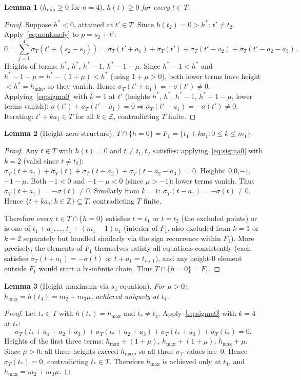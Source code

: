 \documentclass{article}
\newtheorem{lemma}{Lemma}
\begin{document}
\begin{lemma}[$h_{\min}\ge 0$ for $n=4$]\label{lem:betamin4}
$h(t)\ge 0$ for every $t\in T$.
\end{lemma}
\begin{proof}
Suppose $h^*<0$, attained at $t'\in T$.  Since $h(t_2)=0>h^*$: $t'\ne t_2$.
Apply~\eqref{eq:nonlonely} to $p=s_2+t'$:
\[
  0=\sum_{j=1}^4\sigma_T(t'+(s_2-s_j))
  =\sigma_T(t'+a_1)+\sigma_T(t')+\sigma_T(t'-a_2)+\sigma_T(t'-a_2-a_3).
\]
Heights of terms: $h^*$, $h^*$, $h^*-1$, $h^*-1-\mu$.
Since $h^*-1<h^*$ and $h^*-1-\mu=h^*-(1+\mu)<h^*$ (using $1+\mu>0$),
both lower terms have height $<h^*=h_{\min}$, so they vanish.
Hence $\sigma_T(t'+a_1)=-\sigma(t')\ne 0$.
Applying~\eqref{eq:sigma0} with $k=1$ at $t'$ (heights $h^*$, $h^*$, $h^*-1$, $h^*-1-\mu$, lower terms vanish):
$\sigma(t')+\sigma_T(t'-a_1)=0\Rightarrow\sigma_T(t'-a_1)=-\sigma(t')\ne 0$.
Iterating: $t'+ka_1\in T$ for all $k\in\mathbb{Z}$, contradicting $T$ finite.
\end{proof}

\begin{lemma}[Height-zero structure]\label{lem:hzero}
$T\cap\{h=0\}=F_1=\{t_1+ka_1:0\le k\le m_1\}$.
\end{lemma}
\begin{proof}
Any $t\in T$ with $h(t)=0$ and $t\ne t_1,t_2$ satisfies: applying~\eqref{eq:sigma0}
with $k=2$ (valid since $t\ne t_2$):
$\sigma_T(t+a_1)+\sigma_T(t)+\sigma_T(t-a_2)+\sigma_T(t-a_2-a_3)=0$.
Heights: $0$,$0$,$-1$,$-1-\mu$.  Both $-1<0$ and $-1-\mu<0$ (since $\mu>-1$):
lower terms vanish.  Thus $\sigma_T(t+a_1)=-\sigma(t)\ne 0$.
Similarly from $k=1$: $\sigma_T(t-a_1)=-\sigma(t)\ne 0$.
Hence $\{t+ka_1:k\in\mathbb{Z}\}\subseteq T$, contradicting $T$ finite.

Therefore every $t\in T\cap\{h=0\}$ satisfies $t=t_1$ or $t=t_2$ (the excluded points)
or is one of $t_1+a_1,\dots,t_1+(m_1-1)a_1$ (interior of $F_1$, also excluded from $k=1$ or $k=2$ separately but handled similarly via the sign recurrence within $F_1$).
More precisely, the elements of $F_1$ themselves satisfy all equations consistently
(each satisfies $\sigma_T(t+a_1)=-\sigma(t)$ or $t+a_1=t_{i+1}$),
and any height-$0$ element outside $F_1$ would start a bi-infinite chain.
Thus $T\cap\{h=0\}=F_1$.
\end{proof}

\begin{lemma}[Height maximum via $s_4$-equation]\label{lem:betamax4mu}
For $\mu>0$: $h_{\max}=h(t_4)=m_2+m_3\mu$, achieved uniquely at $t_4$.
\end{lemma}
\begin{proof}
Let $t_*\in T$ with $h(t_*)=h_{\max}$ and $t_*\ne t_4$.
Apply~\eqref{eq:sigma0} with $k=4$ at $t_*$:
\[
  \sigma_T(t_*+a_1+a_2+a_3)+\sigma_T(t_*+a_2+a_3)+\sigma_T(t_*+a_3)+\sigma_T(t_*)=0.
\]
Heights of the first three terms: $h_{\max}+(1+\mu)$, $h_{\max}+(1+\mu)$, $h_{\max}+\mu$.
Since $\mu>0$: all three heights exceed $h_{\max}$, so all three $\sigma_T$ values are~$0$.
Hence $\sigma_T(t_*)=0$, contradicting $t_*\in T$.
Therefore $h_{\max}$ is achieved only at $t_4$, and $h_{\max}=m_2+m_3\mu$.
\end{proof}
\end{document}
